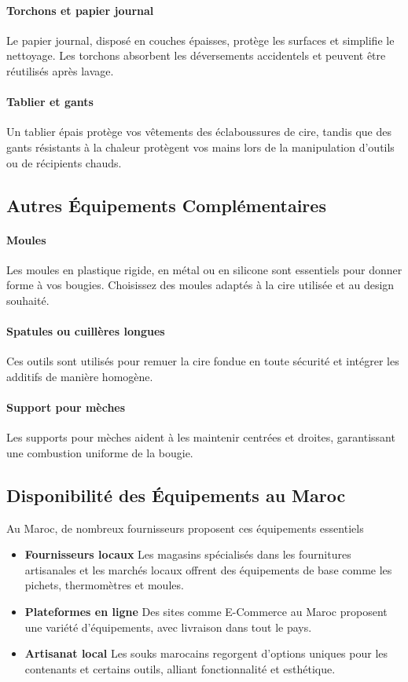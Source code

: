 \documentclass[11pt,fleqn,onecolumn,oneside]{book}
\begin{document}
\paragraph{Torchons et papier journal}
Le papier journal, disposé en couches épaisses, protège les surfaces et simplifie le nettoyage. Les torchons absorbent les déversements accidentels et peuvent être réutilisés après lavage.

\paragraph{Tablier et gants}
Un tablier épais protège vos vêtements des éclaboussures de cire, tandis que des gants résistants à la chaleur protègent vos mains lors de la manipulation d’outils ou de récipients chauds.

\subsection*{Autres Équipements Complémentaires}

\paragraph{Moules}
Les moules en plastique rigide, en métal ou en silicone sont essentiels pour donner forme à vos bougies. Choisissez des moules adaptés à la cire utilisée et au design souhaité.

\paragraph{Spatules ou cuillères longues}
Ces outils sont utilisés pour remuer la cire fondue en toute sécurité et intégrer les additifs de manière homogène.

\paragraph{Support pour mèches}
Les supports pour mèches aident à les maintenir centrées et droites, garantissant une combustion uniforme de la bougie.

\subsection*{Disponibilité des Équipements au Maroc}

Au Maroc, de nombreux fournisseurs proposent ces équipements essentiels
\begin{itemize}
    \item \textbf{Fournisseurs locaux} Les magasins spécialisés dans les fournitures artisanales et les marchés locaux offrent des équipements de base comme les pichets, thermomètres et moules.
    \item \textbf{Plateformes en ligne} Des sites comme E-Commerce au Maroc proposent une variété d’équipements, avec livraison dans tout le pays.
    \item \textbf{Artisanat local} Les souks marocains regorgent d’options uniques pour les contenants et certains outils, alliant fonctionnalité et esthétique.
\end{itemize}
\end{document}
